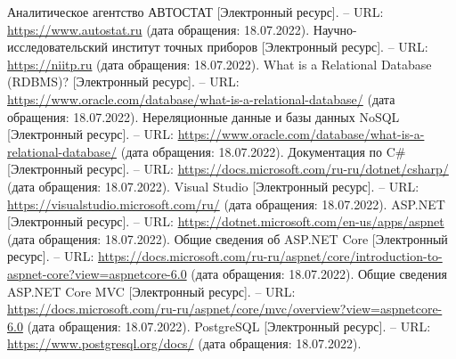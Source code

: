 \documentclass[a4paper,14pt, unknownkeysallowed]{extreport}
\begin{document}
\begin{thebibliography}{11}
	Аналитическое агентство АВТОСТАТ [Электронный ресурс]. -- URL: \url{https://www.autostat.ru} (дата обращения: 18.07.2022).
	Научно-исследовательский институт точных приборов [Электронный ресурс]. -- URL: \url{https://niitp.ru} (дата обращения: 18.07.2022).
	What is a Relational Database (RDBMS)? [Электронный ресурс]. -- URL: \url{https://www.oracle.com/database/what-is-a-relational-database/} (дата обращения: 18.07.2022).
	Нереляционные данные и базы данных NoSQL [Электронный ресурс]. -- URL: \url{https://www.oracle.com/database/what-is-a-relational-database/} (дата обращения: 18.07.2022).
	Документация по C\# [Электронный ресурс]. -- URL: \url{https://docs.microsoft.com/ru-ru/dotnet/csharp/} (дата обращения: 18.07.2022).
	Visual Studio [Электронный ресурс]. -- URL: \url{https://visualstudio.microsoft.com/ru/} (дата обращения: 18.07.2022).
	ASP.NET [Электронный ресурс]. -- URL: \url{https://dotnet.microsoft.com/en-us/apps/aspnet} (дата обращения: 18.07.2022).
	Общие сведения об ASP.NET Core [Электронный ресурс]. -- URL: \url{https://docs.microsoft.com/ru-ru/aspnet/core/introduction-to-aspnet-core?view=aspnetcore-6.0} (дата обращения: 18.07.2022).
	Общие сведения ASP.NET Core MVC [Электронный ресурс]. -- URL: \url{https://docs.microsoft.com/ru-ru/aspnet/core/mvc/overview?view=aspnetcore-6.0} (дата обращения: 18.07.2022).
	PostgreSQL [Электронный ресурс]. -- URL: \url{https://www.postgresql.org/docs/} (дата обращения: 18.07.2022).
\end{thebibliography}

\end{document}
